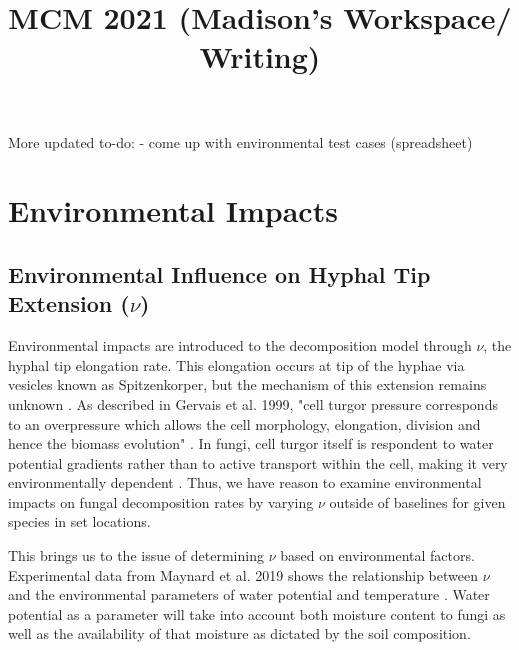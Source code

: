 \documentclass{article}
\title{MCM 2021 (Madison's Workspace/ Writing)}
\author{}
\date{}
\begin{document}

More updated to-do:
- come up with environmental test cases (spreadsheet)

\maketitle

\section{Environmental Impacts}

\subsection{Environmental Influence on Hyphal Tip Extension ($\nu$)}
Environmental impacts are introduced to the decomposition model through $\nu$, the hyphal tip elongation rate. This elongation occurs at tip of the hyphae via vesicles known as Spitzenkorper, but the mechanism of this extension remains unknown \cite{Steinberg2007}. As described in Gervais et al. 1999, "cell turgor pressure corresponds to an overpressure which allows the cell morphology, elongation, division and hence the biomass evolution" \cite{Gervais1999}. In fungi, cell turgor itself is respondent to water potential gradients rather than to active transport within the cell, making it very environmentally dependent \cite{Gervais1999}. Thus, we have reason to examine environmental impacts on fungal decomposition rates by varying $\nu$ outside of baselines for given species in set locations.

This brings us to the issue of determining $\nu$ based on environmental factors. Experimental data from Maynard et al. 2019 shows the relationship between $\nu$ and the environmental parameters of water potential and temperature \cite{Maynard2019}.  Water potential as a parameter will take into account both moisture content to fungi as well as the availability of that moisture as dictated by the  soil composition.
\end{document}
